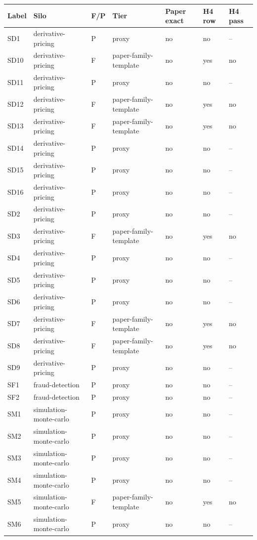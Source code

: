 \begin{tabular}{lllllll}
\toprule
Label & Silo & F/P & Tier & Paper exact & H4 row & H4 pass \\
\midrule
SD1 & derivative-pricing & P & proxy & no & no & -- \\
SD10 & derivative-pricing & F & paper-family-template & no & yes & no \\
SD11 & derivative-pricing & P & proxy & no & no & -- \\
SD12 & derivative-pricing & F & paper-family-template & no & yes & no \\
SD13 & derivative-pricing & F & paper-family-template & no & yes & no \\
SD14 & derivative-pricing & P & proxy & no & no & -- \\
SD15 & derivative-pricing & P & proxy & no & no & -- \\
SD16 & derivative-pricing & P & proxy & no & no & -- \\
SD2 & derivative-pricing & P & proxy & no & no & -- \\
SD3 & derivative-pricing & F & paper-family-template & no & yes & no \\
SD4 & derivative-pricing & P & proxy & no & no & -- \\
SD5 & derivative-pricing & P & proxy & no & no & -- \\
SD6 & derivative-pricing & P & proxy & no & no & -- \\
SD7 & derivative-pricing & F & paper-family-template & no & yes & no \\
SD8 & derivative-pricing & F & paper-family-template & no & yes & no \\
SD9 & derivative-pricing & P & proxy & no & no & -- \\
SF1 & fraud-detection & P & proxy & no & no & -- \\
SF2 & fraud-detection & P & proxy & no & no & -- \\
SM1 & simulation-monte-carlo & P & proxy & no & no & -- \\
SM2 & simulation-monte-carlo & P & proxy & no & no & -- \\
SM3 & simulation-monte-carlo & P & proxy & no & no & -- \\
SM4 & simulation-monte-carlo & P & proxy & no & no & -- \\
SM5 & simulation-monte-carlo & F & paper-family-template & no & yes & no \\
SM6 & simulation-monte-carlo & P & proxy & no & no & -- \\

\end{tabular}
